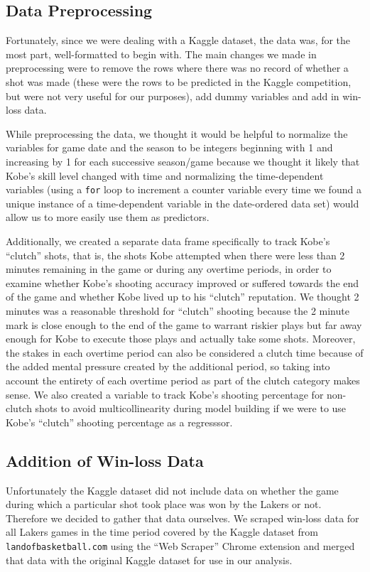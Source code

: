 \documentclass[paper=a4, fontsize=11pt]{scrartcl} %
\numberwithin{equation}{section} %
\numberwithin{figure}{section} %
\numberwithin{table}{section} %
\begin{document}
	\subsection{Data Preprocessing}
	\hspace*{1cm}Fortunately, since we were dealing with a Kaggle dataset, the data was, for the most part, well-formatted to begin with. The main changes we made in preprocessing were to remove the rows where there was no record of whether a shot was made (these were the rows to be predicted in the Kaggle competition, but were not very useful for our purposes), add dummy variables and add in win-loss data.

	\hspace*{1cm}While preprocessing the data, we thought it would be helpful to normalize the variables for game date and the season to be integers beginning with 1 and increasing by 1 for each successive season/game because we thought it likely that Kobe's skill level changed with time and normalizing the time-dependent variables (using a \texttt{for} loop to increment a counter variable every time we found a unique instance of a time-dependent variable in the date-ordered data set) would allow us to more easily use them as predictors.

	\hspace*{1cm}Additionally, we created a separate data frame specifically to track Kobe's ``clutch'' shots, that is, the shots Kobe attempted when there were less than 2 minutes remaining in the game or during any overtime periods, in order to examine whether Kobe's shooting accuracy improved or suffered towards the end of the game and whether Kobe lived up to his ``clutch'' reputation. We thought 2 minutes was a reasonable threshold for ``clutch'' shooting because the 2 minute mark is close enough to the end of the game to warrant riskier plays but far away enough for Kobe to execute those plays and actually take some shots. Moreover, the stakes in each overtime period can also be considered a clutch time because of the added mental pressure created by the additional period, so taking into account the entirety of each overtime period as part of the clutch category makes sense. We also created a variable to track Kobe's shooting percentage for non-clutch shots to avoid multicollinearity during model building if we were to use Kobe's ``clutch'' shooting percentage as a regresssor.
	\subsection{Addition of Win-loss Data}
	\hspace*{1cm}Unfortunately the Kaggle dataset did not include data on whether the game during which a particular shot took place was won by the Lakers or not. Therefore we decided to gather that data ourselves. We scraped win-loss data for all Lakers games in the time period covered by the Kaggle dataset from \texttt{landofbasketball.com} \cite{landofbasketball} using the ``Web Scraper'' Chrome extension and merged that data with the original Kaggle dataset for use in our analysis.
\end{document}

